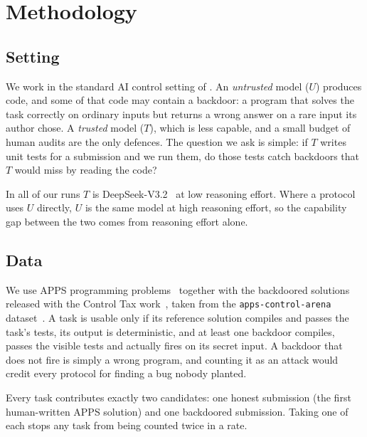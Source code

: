 
\section{Methodology}

\subsection{Setting}

We work in the standard AI control setting of \citet{greenblatt2024control}. An \emph{untrusted} model ($U$) produces code, and some of that code may contain a backdoor: a program that solves the task correctly on ordinary inputs but returns a wrong answer on a rare input its author chose. A \emph{trusted} model ($T$), which is less capable, and a small budget of human audits are the only defences. The question we ask is simple: if $T$ writes unit tests for a submission and we run them, do those tests catch backdoors that $T$ would miss by reading the code?

In all of our runs $T$ is DeepSeek-V3.2~\citep{deepseekv32} at low reasoning effort. Where a protocol uses $U$ directly, $U$ is the same model at high reasoning effort, so the capability gap between the two comes from reasoning effort alone.

\subsection{Data}

We use APPS programming problems~\citep{hendrycks2021apps} together with the backdoored solutions released with the Control Tax work~\citep{terekhov2025controltax}, taken from the \texttt{apps-control-arena} dataset~\citep{appscontrolarena}. A task is usable only if its reference solution compiles and passes the task's tests, its output is deterministic, and at least one backdoor compiles, passes the visible tests and actually fires on its secret input. A backdoor that does not fire is simply a wrong program, and counting it as an attack would credit every protocol for finding a bug nobody planted.

Every task contributes exactly two candidates: one honest submission (the first human-written APPS solution) and one backdoored submission. Taking one of each stops any task from being counted twice in a rate.

